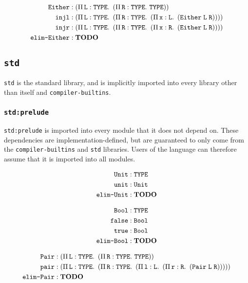 \begin{align}
	\texttt{Either} & : \left(\Pi\,\mathit{\texttt{L}}:\texttt{TYPE}.\ \left(\Pi\,\mathit{\texttt{R}}:\texttt{TYPE}.\ \texttt{TYPE}\right)\right) \\
	\texttt{injl} & : \left(\Pi\,\mathit{\texttt{L}}:\texttt{TYPE}.\ \left(\Pi\,\mathit{\texttt{R}}:\texttt{TYPE}.\ \left(\Pi\,\mathit{\texttt{x}}:\texttt{L}.\ \left(\texttt{\texttt{Either}}\;\texttt{L}\;\texttt{R}\right)\right)\right)\right) \\
	\texttt{injr} & : \left(\Pi\,\mathit{\texttt{L}}:\texttt{TYPE}.\ \left(\Pi\,\mathit{\texttt{R}}:\texttt{TYPE}.\ \left(\Pi\,\mathit{\texttt{x}}:\texttt{R}.\ \left(\texttt{\texttt{Either}}\;\texttt{L}\;\texttt{R}\right)\right)\right)\right) \\
	\texttt{elim-Either} & : \textbf{TODO}
\end{align}

\subsection{\texttt{std}}
\texttt{std} is the standard library, and is implicitly imported into every library other than itself and \texttt{compiler-builtins}.

\subsubsection{\texttt{std:prelude}}
\texttt{std:prelude} is imported into every module that it does not depend on.
These dependencies are implementation-defined, but are guaranteed to only come from the \texttt{compiler-builtins} and \texttt{std} libraries.
Users of the language can therefore assume that it is imported into all modules.

\begin{align}
	\texttt{Unit} & : \texttt{TYPE} \\
	\texttt{unit} & : \texttt{Unit} \\
	\texttt{elim-Unit} & : \textbf{TODO}
\end{align}

\begin{align}
	\texttt{Bool} & : \texttt{TYPE} \\
	\texttt{false} & : \texttt{Bool} \\
	\texttt{true} & : \texttt{Bool} \\
	\texttt{elim-Bool} & : \textbf{TODO}
\end{align}

\begin{align}
	\texttt{Pair} & : \left(\Pi\,\mathit{\texttt{L}}:\texttt{TYPE}.\ \left(\Pi\,\mathit{\texttt{R}}:\texttt{TYPE}.\ \texttt{TYPE}\right)\right) \\
	\texttt{pair} & : \left(\Pi\,\mathit{\texttt{L}}:\texttt{TYPE}.\ \left(\Pi\,\mathit{\texttt{R}}:\texttt{TYPE}.\ \left(\Pi\,\mathit{\texttt{l}}:\texttt{L}.\ \left(\Pi\,\mathit{\texttt{r}}:\texttt{R}.\ \left(\texttt{Pair}\;\texttt{L}\;\texttt{R}\right)\right)\right)\right)\right) \\
	\texttt{elim-Pair} & : \textbf{TODO}
\end{align}
